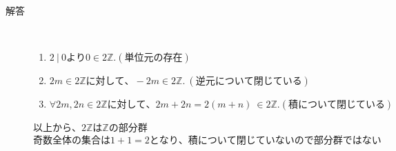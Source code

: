 \documentclass[dvipdfmx]{jsarticle}
\begin{document}
\begin{description}
  \item[解答] \mbox{} \\
  \begin{enumerate}
    \item $ 2 \ | \ 0 より 0 \in 2 \mathbb{Z}.(単位元の存在)$
    \item $ 2m \in 2 \mathbb{Z}に対して、-2m \in 2\mathbb{Z}. \ (逆元について閉じている)$
    \item $\forall 2m, 2n \in 2\mathbb{Z}に対して、2m + 2n = 2(m+n) \ \in 2\mathbb{Z}.(積について閉じている)$
  \end{enumerate}
  以上から、$2\mathbb{Z}は\mathbb{Z}の部分群$ \\
  $奇数全体の集合は1+1 = 2 となり、積について閉じていないので部分群ではない$

\end{description}
\end{document}
